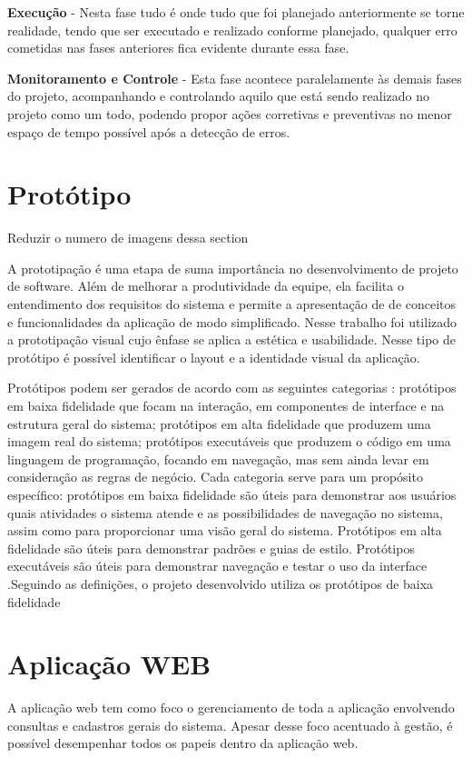 {	{\textbf{Execução} - Nesta fase tudo é onde tudo que foi planejado anteriormente se torne realidade, tendo que ser executado e realizado conforme planejado, qualquer erro cometidas nas fases anteriores fica evidente durante essa fase. }
	
	{\textbf{Monitoramento e Controle} - Esta fase acontece paralelamente às demais fases do projeto, acompanhando e controlando aquilo que está sendo realizado no projeto como um todo, podendo propor ações corretivas e preventivas no menor espaço de tempo possível após a detecção de erros.}


\section{Protótipo}

{\color{red} Reduzir o numero de imagens dessa section}

A prototipação é uma etapa de suma importância no desenvolvimento de projeto de software. Além de melhorar a produtividade da equipe, ela facilita o entendimento dos requisitos do sistema e permite a apresentação de de conceitos e funcionalidades da aplicação de modo simplificado.
Nesse trabalho foi utilizado a prototipação visual cujo ênfase se aplica a estética e usabilidade. Nesse tipo de protótipo é possível identificar o layout e a identidade visual da aplicação. \cite{dextra2013prototipacao}

{Protótipos podem ser gerados de acordo com as seguintes categorias \cite{coyette2004sketchixml}: protótipos em baixa fidelidade que focam na interação, em componentes de interface e na estrutura geral do sistema; protótipos em alta fidelidade que produzem uma imagem real do sistema; protótipos executáveis que produzem o código em uma linguagem de programação, focando em navegação, mas sem ainda levar em consideração as regras de negócio. Cada categoria serve para um propósito específico: protótipos em baixa fidelidade são úteis para demonstrar aos usuários quais atividades o sistema atende e as possibilidades de navegação no sistema, assim como para proporcionar uma visão geral do sistema. Protótipos em alta fidelidade são úteis para demonstrar padrões e guias de estilo. Protótipos executáveis são úteis para demonstrar navegação e testar o uso da interface \cite{rosemberg2008prototipaccao}.Seguindo as definições, o projeto desenvolvido utiliza os protótipos de baixa fidelidade}

\section{Aplicação WEB}
A aplicação web tem como foco o gerenciamento de toda a aplicação envolvendo consultas e cadastros gerais do sistema.
Apesar desse foco acentuado à gestão, é possível desempenhar todos os papeis dentro da aplicação web.


}
